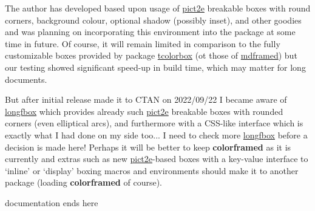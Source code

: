 \documentclass[a4paper,dvipdfmx,10pt,english]{article}
\def\ctanpackage#1{\href{https://ctan.org/pkg/#1}{#1}}
\newcommand\colorframed{%
        \texorpdfstring{{\color{joli}\bfseries colorframed}}{colorframed}\xspace}
\begin{document}
\begin{snugshade}
%
%
%
%

The author has developed based upon usage of \ctanpackage{pict2e}
breakable boxes with round corners, background colour, optional
shadow (possibly inset), and other goodies and was planning on
incorporating this environment into the package at some time in future.
%
Of course, it will remain limited in comparison to the fully
customizable boxes provided by package \ctanpackage{tcolorbox} (ot
those of \ctanpackage{mdframed}) but our testing showed
significant speed-up in build time, which may matter for long
documents.



  But after initial release made it to CTAN on
  2022/09/22 I became aware of \ctanpackage{longfbox} which
  provides already such \ctanpackage{pict2e} breakable boxes with
  rounded corners (even elliptical arcs), and furthermore with a
  CSS-like interface which is exactly what I had done on my side
  too... I need to check more \ctanpackage{longfbox} before a
  decision is made here!  Perhaps it will be better to keep
  \colorframed as it is currently and
  extras such as new \ctanpackage{pict2e}-based boxes with a key-value
  interface to `inline' or `display' boxing macros and environments
  should make it to another package (loading \colorframed of course).

\end{snugshade}
\centerline{\hrulefill documentation ends here\hrulefill}
\end{document}
